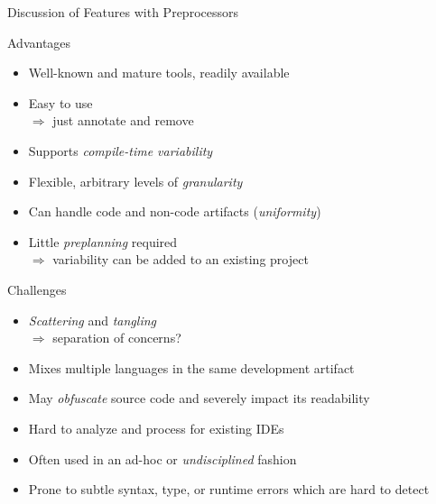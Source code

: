 \begin{frame}{Discussion of Features with Preprocessors}
	\begin{mycolumns}[animation=none]
		\begin{note}{Advantages}
			\begin{itemize}
				\item Well-known and mature tools, readily available
				\item Easy to use\\
				$\Rightarrow$ just annotate and remove
				\item Supports \emph{compile-time variability}
				\item Flexible, arbitrary levels of \emph{granularity}
				\item Can handle code and non-code artifacts (\emph{uniformity})
				\item Little \emph{preplanning} required\\
				$\Rightarrow$ variability can be added to an existing project
			\end{itemize}
		\end{note}
	\mynextcolumn
		\pause
		\begin{note}{Challenges}
			\begin{itemize}
				\item \emph{Scattering} and \emph{tangling}\\
				$\Rightarrow$ separation of concerns?
				\item Mixes multiple languages in the same development artifact
				\item May \emph{obfuscate} source code and severely impact its readability
				\item Hard to analyze and process for existing IDEs
				\item Often used in an ad-hoc or \emph{undisciplined} fashion
				\item Prone to subtle syntax, type, or runtime errors which are hard to detect \mysource{\lectureinteractions--\lecturetesting}
			\end{itemize}
		\end{note}
	\end{mycolumns}
\end{frame}

